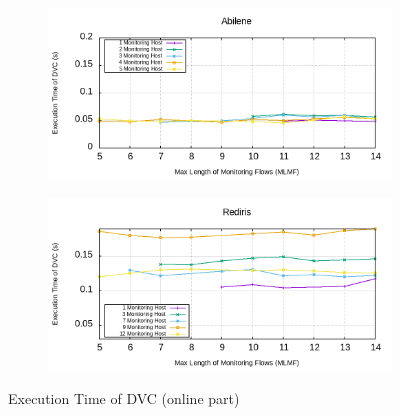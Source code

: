 \documentclass[10pt, journal, letterpaper]{IEEEtran}
\begin{document}
\begin{figure}
    \begin{subfigure}{\columnwidth}
       \centering
        \includegraphics[width=0.8\columnwidth]{img/eval_Abilene_Max_Length_of_Routes_Execution_time_PSO.png}
    \end{subfigure}
    \begin{subfigure}{\columnwidth}
      \centering
      \includegraphics[width=0.8\columnwidth]{img/eval_Rediris_Max_Length_of_Routes_Execution_time_PSO.png}
    \end{subfigure}
    \caption{Execution Time of DVC (online part)}
    \label{fig:Abilene_time_DMI}
\end{figure} 
\end{document}
